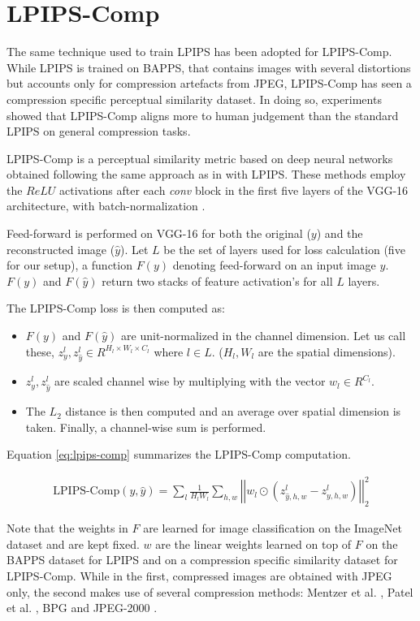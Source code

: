 \section{LPIPS-Comp}
\label{sec:lpipscomp}
The same technique used to train LPIPS has been adopted for LPIPS-Comp. While LPIPS is trained on BAPPS, that contains images with several distortions but accounts only for compression artefacts from JPEG, LPIPS-Comp has seen a compression specific perceptual similarity dataset. In doing so, experiments showed that LPIPS-Comp aligns more to human judgement than the standard LPIPS on general compression tasks.

LPIPS-Comp \cite{patel2021saliency} is a perceptual similarity metric based on deep neural networks obtained following the same approach as in \cite{zhang2018unreasonable} with LPIPS.
These methods employ the $ReLU$ activations after each \textit{conv} block in the first five layers of the VGG-16 \cite{simonyan2014very} architecture, with batch-normalization \cite{ioffe2015batch}.

Feed-forward is performed on VGG-16 for both the original ($y$) and the reconstructed image ($\hat{y}$).
Let $L$ be the set of layers used for loss calculation (five for our setup), a function $F(y)$ denoting feed-forward on an input image $y$.
$F(y)$ and $F(\hat{y})$ return two stacks of feature activation’s for all $L$ layers.

The LPIPS-Comp loss is then computed as:
\begin{itemize}
\item $F(y)$ and $F(\hat{y})$ are unit-normalized in the channel dimension. Let us call these, $z^l_y, z^l_{\hat{y}} \in R^{H_l \times W_l \times C_l}$ where $l \in L$. ($H_l, W_l$ are the spatial dimensions).
\item $z^l_y , z^l_{\hat{y}}$ are scaled channel wise by multiplying with the vector $w_l \in R^{C_l}$.
\item The $L_2$ distance is then computed and an average over spatial dimension is taken. Finally, a channel-wise sum is performed.
\end{itemize}

Equation \ref{eq:lpips-comp} summarizes the LPIPS-Comp computation.

\begin{align}
\text{LPIPS-Comp}(y, \hat{y}) = \sum_{l} \frac{1}{H_l W_l} \sum_{h, w} \left| \left| w_l \odot \left( z^l_{\hat{y}, h, w} - z^l_{y, h, w} \right) \right| \right|^2_2\label{eq:lpips-comp}
\end{align}

Note that the weights in $F$ are learned for image classification on the ImageNet dataset \cite{russakovsky2015imagenet} and are kept fixed. $w$ are the linear weights learned on top of $F$ on the BAPPS \cite{zhang2018unreasonable} dataset for LPIPS and on a compression specific similarity dataset for LPIPS-Comp. While in the first, compressed images are obtained with JPEG only, the second makes use of several compression methods: Mentzer et al. \cite{mentzer2018conditional}, Patel et al. \cite{patel2019deep}, BPG \cite{bellard2014bpg} and JPEG-2000 \cite{skodras2001jpeg}.
